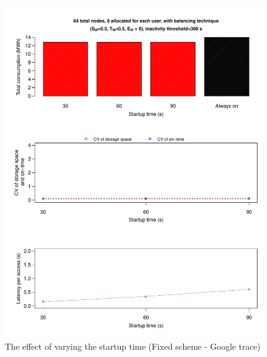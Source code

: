 \documentclass[preprint,12pt]{elsarticle}
\begin{document}
\begin{figure}[!htbp]
\centering
\includegraphics[width=\columnwidth,keepaspectratio]{FIG7.pdf}
\caption{The effect of varying the startup time (Fixed scheme - Google trace)}
\label{secondresult}
\end{figure}
\end{document}
